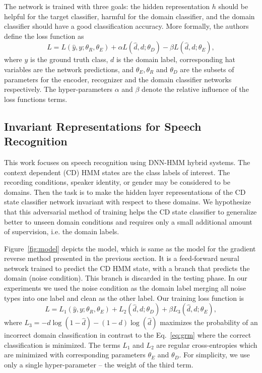 \documentclass{article}
\begin{document}
    The network is trained with three goals: the hidden representation $h$ should
    be helpful for the target classifier, harmful for the domain classifier,
    and the domain classifier should have a good classification accuracy. More 
    formally, the authors define the loss function as
    \begin{equation}
        L = L(\hat{y}, y; \theta_R, \theta_E) + 
        \alpha L(\hat{d}, d; \theta_D) -
        \beta L(\hat{d}, d; \theta_E),
        \label{eq:grm}
    \end{equation}
    where $y$ is the ground truth class, $d$ is the domain label, corresponding
    hat variables are the network predictions, and $\theta_E, \theta_R$ and $\theta_D$ are the subsets of  parameters for the encoder,
    recognizer and the domain classifier networks respectively. The hyper-parameters
    $\alpha$ and $\beta$ denote the relative influence of the loss functions terms.

\subsection{Invariant Representations for Speech Recognition}
\label{sec:invariant-speech}

This work focuses on speech recognition using DNN-HMM hybrid systems. The context dependent (CD) HMM states are the class labels of interest. The
recording conditions, speaker identity, or gender may be considered to be domains. Then the task is to make the hidden layer representations of the CD state classifier network 
invariant with respect to these domains. We hypothesize that this adversarial method of
training helps the CD state classifier to generalize better to unseen domain conditions and requires only a  
small additional amount of supervision, i.e. the domain labels.  

Figure~\ref{fig:model} depicts the model, which is same as the model for the gradient reverse method presented in the previous section. It is a feed-forward neural network trained to predict the CD HMM state, with a branch that predicts the domain (noise condition). This branch is discarded in the testing phase. In our experiments we
used the noise condition as the domain label merging all noise types into one label
and clean as the other label. Our training loss function is
    \begin{equation}
        L = L_1(\hat{y}, y; \theta_R, \theta_E) + 
        L_2(\hat{d}, d; \theta_D) +
        \beta L_3(\hat{d}, d; \theta_E),
        \label{eq:cost}
    \end{equation}
where $L_3 = - d\log(1 - \hat{d}) - (1-d)\log(\hat{d})$ maximizes the probability
of an incorrect domain classification in contrast to the Eq.~\ref{eq:grm} where the 
correct classification is minimized.
The terms $L_1$ and $L_2$ are 
regular cross-entropies which are minimized with corresponding parameters $\theta_E$ and $\theta_D$.
For simplicity, we use only a single hyper-parameter -- the weight of the third term.
\end{document}
